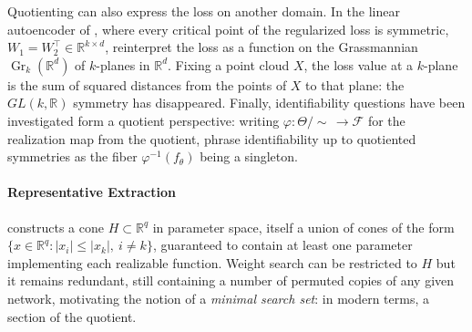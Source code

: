 \documentclass[mathematics,review,submit,moreauthors]{Definitions/mdpi}
\begin{document}
Quotienting can also express the loss on another domain.
In the linear autoencoder of , where every critical point of the regularized loss is symmetric, $W_1=W_2^{\top}\in \mathbb R^{k\times d}$, \citet{kunin2019p3icml} reinterpret the loss as a function on the Grassmannian $\operatorname{Gr}_k(\mathbb{R}^d)$ of $k$-planes in $\mathbb{R}^d$.
Fixing a point cloud $X$, the loss value at a $k$-plane is the sum of squared distances from the points of $X$ to that plane: the $GL(k,\mathbb{R})$ symmetry has disappeared.
Finally, identifiability questions have been investigated form a quotient perspective: writing $\varphi:\Theta/\!\sim\,\to\mathcal{F}$ for the realization map from the quotient, \citet{grillo2026} phrase identifiability up to quotiented symmetries as the fiber $\varphi^{-1}(f_\theta)$ being a singleton.

\paragraph{Representative Extraction}
\citet{hecht-nielsen1990anc} constructs a cone $H\subset\mathbb{R}^q$ in parameter space, itself a union of cones of the form $\{x\in\mathbb{R}^q : |x_i|\le|x_k|,\ i\neq k\}$, guaranteed to contain at least one parameter implementing each realizable function.
Weight search can be restricted to $H$ but it remains redundant, still containing a number of permuted copies of any given network, motivating the notion of a \emph{minimal search set}: in modern terms, a section of the quotient.
\end{document}
